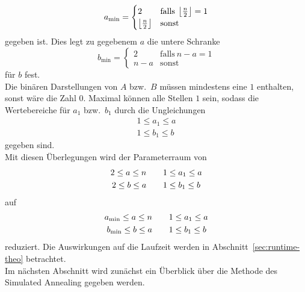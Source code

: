 \begin{equation}
		a_\mathrm{\min}=\begin{cases}
						2 & \mathrm{falls}\:\left\lfloor\frac{n}{2}\right\rfloor = 1 \\
						\left\lfloor\frac{n}{2}\right\rfloor & \mathrm{sonst}
		\end{cases}\label{eq:amin}
\end{equation}
gegeben ist. Dies legt zu gegebenem $a$ die untere Schranke
\begin{equation}
		b_\mathrm{\min}=\begin{cases}
						2 & \mathrm{falls}\:n-a=1 \\
						n-a & \mathrm{sonst}
		\end{cases}\label{eq:amax}
\end{equation}
für $b$ fest.\\
Die binären Darstellungen von $A$ bzw.\ $B$ müssen mindestens eine $1$ enthalten, sonst wäre die Zahl $0$. Maximal können alle Stellen $1$ sein, sodass die Wertebereiche für $a_1$ bzw.\ $b_1$ durch die Ungleichungen
\begin{align*}
		1\leq a_1\leq a \\
		1\leq b_1\leq b
\end{align*}
gegeben sind.\\
Mit diesen Überlegungen wird der Parameterraum von
\begin{align}
		2 \leq a \leq n &\quad\quad 1 \leq a_1 \leq a \notag \\
		2 \leq b \leq a &\quad\quad	1 \leq b_1 \leq b \label{eq:parameterspace1}
\end{align}
auf
\begin{align}
		a_\mathrm{\min} \leq a \leq n &\quad\quad	1 \leq a_1 \leq a \notag \\
		b_\mathrm{\min} \leq b \leq a &\quad\quad	1 \leq b_1 \leq b \label{eq:parameterspace2}
\end{align}
reduziert. Die Auswirkungen auf die Laufzeit werden in Abschnitt~\ref{sec:runtime-theo} betrachtet. \\
Im nächsten Abschnitt wird zunächst ein Überblick über die Methode des Simulated Annealing gegeben werden.

